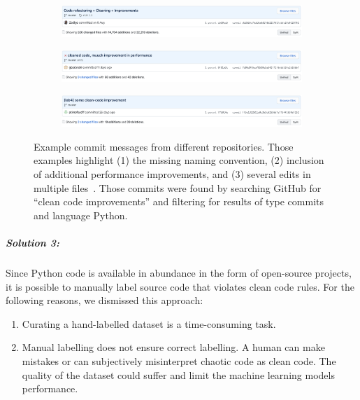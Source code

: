 \begin{figure}
    \begin{subfigure}{\textwidth}
        \includegraphics[width=1\linewidth]{img/ML/commit_messages/screen_1.png}
    \end{subfigure}
    \begin{subfigure}{\textwidth}
        \includegraphics[width=1\linewidth]{img/ML/commit_messages/screen_2.png}
    \end{subfigure}
    \begin{subfigure}{\textwidth}
        \includegraphics[width=1\linewidth]{img/ML/commit_messages/screen_3.png}
    \end{subfigure}
    \caption[Example commit messages that underlines the inconsistency in commit message naming.]{Example commit messages from different repositories. Those examples highlight (1) the missing naming convention, (2) inclusion of additional performance improvements, and (3) several edits in multiple files~\cite{pendenque_code_2020, baranski_cleaned_2020, timofeev_lab4_2020}. Those commits were found by searching GitHub for \enquote{clean code improvements} and filtering for results of type commits and language Python. }
    \label{fig:commit_messages}
\end{figure}


\subparagraph{Solution 3:}
Since Python code is available in abundance in the form of open-source projects, it is possible to manually label source code that violates clean code rules. 
For the following reasons, we dismissed this approach:
\begin{enumerate}
    \item Curating a hand-labelled dataset is a time-consuming task. 
    \item Manual labelling does not ensure correct labelling. A human can make mistakes or can subjectively misinterpret chaotic code as clean code. The quality of the dataset could suffer and limit the machine learning models performance.
\end{enumerate}

